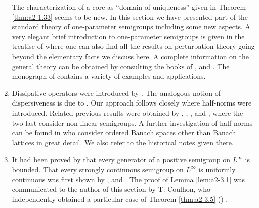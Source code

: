 \begin{enumerate}[label=\emph{Section \arabic*:}, wide, itemsep=1ex]
The characterization of a core as \enquote{domain of uniqueness} given in Theorem \ref{thm:a2-1.33}   seems to be new.
In this section we have presented part of the standard theory of one-parameter semigroups including some new aspects.
A very elegant brief introduction to one-parameter semigroups is given in the treatise of \citet{kato:1966} where one can also find all the results on perturbation theory going beyond the elementary facts we discuss here.
A complete information on the general theory can be obtained by consulting the books of \citet{davies:1980}, \citet{goldstein:1985a} and \citet{pazy:1983}.
The monograph of \citet{goldstein:1985a} contains a variety of examples and applications.

\item
Dissipative operators were introduced by \citet{lumerphillips:1961}.
The analogous notion of dispersiveness is due to \citet{phillips:1962}.
Our approach follows closely \citet{arendtchernoffkato:1982} where half-norms were introduced.
Related previous results were obtained by \citet{calvert:1971a}, \citet{hasegawa:1966}, \citet{sato:1968}, \citet{benilanpicard:1979} and \citet{picard:1972}, where the two last consider non-linear semigroups.
A further investigation of half-norms can be found in \citet{battyrobinson:1984} who consider ordered Banach spaces other than Banach lattices in great detail.
We also refer to the historical notes given there.

\item
It had been proved by \citet{kishimotorobinson:1981} that every generator of a positive semigroup on $L^{\infty}$ is bounded.
That every strongly continuous semigroup on $L^{\infty}$ is uniformly continuous was first shown by \citet{lotz:1982}, \citet{lotz:1984} and \citet{lotz:1985}.
The proof of Lemma \ref{lem:a2-3.1}  was communicated to the author of this section by T. Coulhon, who independently obtained a particular case of Theorem \ref{thm:a2-3.5} (\citet{coulhon:1984}) .

\end{enumerate}

 \RaggedRight
 
 
